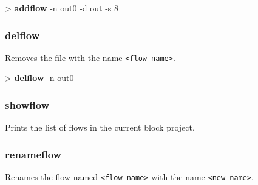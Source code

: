 \documentclass[10pt,a4paper]{article}
\begin{document}

\begin{sampletitle}
> \textbf{\tool{} addflow} -n out0 -d out -s 8
\end{sampletitle}


\subsubsection{delflow}
\label{subsec:delflow}

Removes the file with the name \texttt{<flow-name>}.\\


\begin{sampletitle}
> \textbf{\tool{} delflow} -n out0
\end{sampletitle}


\subsubsection{showflow}
\label{subsec:showflow}

Prints the list of flows in the current block project.

\subsubsection{renameflow}
\label{subsec:renameflow}

Renames the flow named \texttt{<flow-name>} with the name \texttt{<new-name>}.\\
\end{document}
